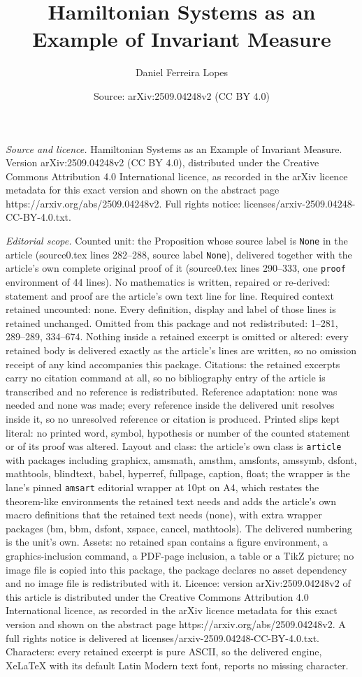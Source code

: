 \documentclass[10pt,a4paper]{amsart}
\title[Hamiltonian Systems as an Example of Invariant Measure]{Hamiltonian Systems as an Example of Invariant Measure}
\author{Daniel Ferreira Lopes}
\date{Source: arXiv:2509.04248v2 (CC BY 4.0)}
\begin{document}
\maketitle

\noindent\emph{Source and licence.} Hamiltonian Systems as an Example of Invariant Measure. Version arXiv:2509.04248v2 (CC BY 4.0), distributed under the Creative Commons Attribution 4.0 International licence, as recorded in the arXiv licence metadata for this exact version and shown on the abstract page https://arxiv.org/abs/2509.04248v2. Full rights notice: licenses/arxiv-2509.04248-CC-BY-4.0.txt.\par\smallskip

\noindent\textit{Editorial scope.} Counted unit: the Proposition whose source label is \texttt{None} in the article (source0.tex lines 282--288, source label \texttt{None}), delivered together with the article's own complete original proof of it (source0.tex lines 290--333, one \texttt{proof} environment of 44 lines). No mathematics is written, repaired or re-derived: statement and proof are the article's own text line for line. Required context retained uncounted: none. Every definition, display and label of those lines is retained unchanged. Omitted from this package and not redistributed: 1--281, 289--289, 334--674. Nothing inside a retained excerpt is omitted or altered: every retained body is delivered exactly as the article's lines are written, so no omission receipt of any kind accompanies this package. Citations: the retained excerpts carry no citation command at all, so no bibliography entry of the article is transcribed and no reference is redistributed. Reference adaptation: none was needed and none was made; every reference inside the delivered unit resolves inside it, so no unresolved reference or citation is produced. Printed slips kept literal: no printed word, symbol, hypothesis or number of the counted statement or of its proof was altered. Layout and class: the article's own class is \texttt{article} with packages including graphicx, amsmath, amsthm, amsfonts, amssymb, dsfont, mathtools, blindtext, babel, hyperref, fullpage, caption, float; the wrapper is the lane's pinned \texttt{amsart} editorial wrapper at 10pt on A4, which restates the theorem-like environments the retained text needs and adds the article's own macro definitions that the retained text needs (none), with extra wrapper packages (bm, bbm, dsfont, xspace, cancel, mathtools). The delivered numbering is the unit's own. Assets: no retained span contains a figure environment, a graphics-inclusion command, a PDF-page inclusion, a table or a TikZ picture; no image file is copied into this package, the package declares no asset dependency and no image file is redistributed with it. Licence: version arXiv:2509.04248v2 of this article is distributed under the Creative Commons Attribution 4.0 International licence, as recorded in the arXiv licence metadata for this exact version and shown on the abstract page https://arxiv.org/abs/2509.04248v2. A full rights notice is delivered at licenses/arxiv-2509.04248-CC-BY-4.0.txt. Characters: every retained excerpt is pure ASCII, so the delivered engine, XeLaTeX with its default Latin Modern text font, reports no missing character.
\end{document}
